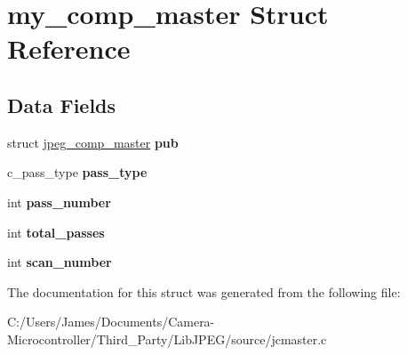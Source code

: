\hypertarget{structmy__comp__master}{}\section{my\+\_\+comp\+\_\+master Struct Reference}
\label{structmy__comp__master}
\subsection*{Data Fields}
\begin{DoxyCompactItemize}
\item 
\mbox{\label{structmy__comp__master_aa2cf3a6e6a75901f831b30cabeb6b033}} 
struct \hyperlink{structjpeg__comp__master}{jpeg\+\_\+comp\+\_\+master} {\bfseries pub}
\item 
\mbox{\label{structmy__comp__master_a028d35d39fe7da6cc095c979745e9f78}} 
c\+\_\+pass\+\_\+type {\bfseries pass\+\_\+type}
\item 
\mbox{\label{structmy__comp__master_a0f341c28cc76210dfd9a60c1c2f93257}} 
int {\bfseries pass\+\_\+number}
\item 
\mbox{\label{structmy__comp__master_aba790bf96f4426d51ad59fe8325a1c38}} 
int {\bfseries total\+\_\+passes}
\item 
\mbox{\label{structmy__comp__master_aa66f83d802d29a53bc58f203272f2a74}} 
int {\bfseries scan\+\_\+number}
\end{DoxyCompactItemize}


The documentation for this struct was generated from the following file\+:\begin{DoxyCompactItemize}
\item 
C\+:/\+Users/\+James/\+Documents/\+Camera-\/\+Microcontroller/\+Third\+\_\+\+Party/\+Lib\+J\+P\+E\+G/source/jcmaster.\+c\end{DoxyCompactItemize}
